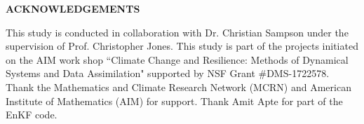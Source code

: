 
\begin{center}
\vspace*{52pt}
{\Large \textbf{ACKNOWLEDGEMENTS}}
\end{center}

This study is conducted in collaboration with Dr. Christian Sampson under the supervision of Prof. Christopher Jones. This study is part of the projects initiated on the AIM work shop ``Climate Change and Resilience: Methods of Dynamical Systems and Data Assimilation" supported by NSF Grant {\#}DMS-1722578. Thank the Mathematics and Climate Research Network (MCRN) and American Institute of Mathematics (AIM) for support. Thank Amit Apte for part of the EnKF code.

\clearpage
